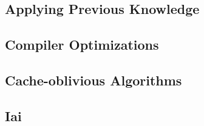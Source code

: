 \subsection{Applying Previous Knowledge}
\subsection{Compiler Optimizations}
\subsection{Cache-oblivious Algorithms}
\subsection{Iai}
